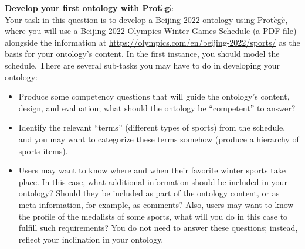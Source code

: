 \documentclass[12pt,a4paper]{article}
\newenvironment{problem}[2][{\color{red}Question}]{\begin{trivlist}
\item[\hskip \labelsep {\bfseries #1}\hskip \labelsep {\bfseries #2.}]}{\end{trivlist}}
\begin{document}
\begin{problem}{{\color{red}10}}
\textbf{Develop your first ontology with Prot$\acute{e}$g$\acute{e}$}\\
Your task in this question is to develop a Beijing 2022 ontology using Prot$\acute{e}$g$\acute{e}$, where you will use a Beijing 2022 Olympics Winter Games Schedule (a PDF file) alongside the information at \url{https://olympics.com/en/beijing-2022/sports/} as the basis for your ontology's content. In the first instance, you should model the schedule. There are several sub-tasks you may have to do in developing your ontology:
\begin{itemize}
    \item Produce some competency questions that will guide the ontology's content, design, and evaluation; what should the ontology be ``competent'' to answer?
    \item Identify the relevant ``terms'' (different types of sports) from the schedule, and you may want to categorize these terms somehow (produce a hierarchy of sports items). 
    \item Users may want to know where and when their favorite winter sports take place. In this case, what additional information should be included in your ontology? Should they be included as part of the ontology content, or as meta-information, for example, as comments? Also, users may want to know the profile of the medalists of some sports, what will you do in this case to fulfill such requirements? You do not need to answer these questions; instead, reflect your inclination in your ontology. 
\end{itemize}
\end{problem}
\end{document}
